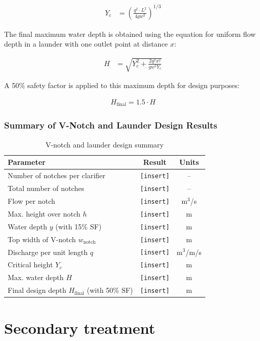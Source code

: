 \documentclass[12pt]{article}
\begin{document}
\begin{align}
Y_c &= \left( \frac{q^2 \cdot L^2}{4 g w^2} \right)^{1/3}
\end{align}

The final maximum water depth is obtained using the equation for uniform flow depth in a launder with one outlet point at distance \( x \):

\begin{align}
H &= \sqrt{Y_c^2 + \frac{2 q^2 x^2}{g w^2 Y_c}}
\end{align}

A 50\% safety factor is applied to this maximum depth for design purposes:

\begin{align}
H_{\text{final}} = 1.5 \cdot H
\end{align}

\subsubsection*{Summary of V-Notch and Launder Design Results}

\begin{table}[h]
\centering
\caption{V-notch and launder design summary}
\label{tab:vnotch_results}
\begin{tabular}{|l|c|c|}
\hline
\textbf{Parameter} & \textbf{Result} & \textbf{Units} \\
\hline
Number of notches per clarifier & \texttt{[insert]} & -- \\
Total number of notches & \texttt{[insert]} & -- \\
Flow per notch & \texttt{[insert]} & m$^3$/s \\
Max. height over notch $h$ & \texttt{[insert]} & m \\
Water depth $y$ (with 15\% SF) & \texttt{[insert]} & m \\
Top width of V-notch $w_{\text{notch}}$ & \texttt{[insert]} & m \\
Discharge per unit length $q$ & \texttt{[insert]} & m$^3$/m/s \\
Critical height $Y_c$ & \texttt{[insert]} & m \\
Max. water depth $H$ & \texttt{[insert]} & m \\
Final design depth $H_{\text{final}}$ (with 50\% SF) & \texttt{[insert]} & m \\
\hline
\end{tabular}
\end{table}


\section{Secondary treatment}
\label{sec:secondary_trat}
\end{document}
